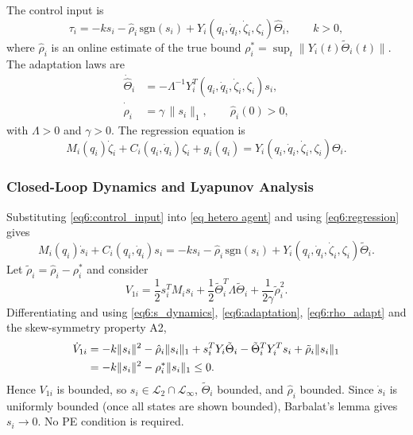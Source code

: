 The control input is
\begin{equation}\label{eq6:control_input}
	\tau_i = -k s_i - \hat{\rho}_i\,\mathrm{sgn}(s_i)
	+ Y_i(q_i,\dot{q}_i,\dot{\zeta}_i,\zeta_i) \hat{\Theta}_i,\qquad k>0,
\end{equation}
where $\hat{\rho}_i$ is an online estimate of the true bound
$\rho_i^* = \sup_t\|Y_i(t)\tilde{\Theta}_i(t)\|$. The adaptation laws are
\begin{align}
	\dot{\hat{\Theta}}_i &= -\Lambda^{-1} Y_i^T(q_i,\dot{q}_i,\dot{\zeta}_i,\zeta_i) s_i,
	\label{eq6:adaptation}\\
	\dot{\hat{\rho}}_i &= \gamma\,\|s_i\|_1,\qquad \hat{\rho}_i(0) > 0,
	\label{eq6:rho_adapt}
\end{align}
with $\Lambda > 0$ and $\gamma > 0$. The regression equation is
\begin{equation}\label{eq6:regression}
	M_i(q_i)\dot{\zeta}_i + C_i(q_i,\dot{q}_i)\zeta_i + g_i(q_i)
	= Y_i(q_i,\dot{q}_i,\dot{\zeta}_i,\zeta_i)\Theta_i.
\end{equation}

\subsubsection{Closed-Loop Dynamics and Lyapunov Analysis}

Substituting \eqref{eq6:control_input} into \eqref{eq hetero agent} and using
\eqref{eq6:regression} gives
\begin{equation}\label{eq6:s_dynamics}
	M_i(q_i)\dot{s}_i + C_i(q_i,\dot{q}_i)s_i
	= -k s_i - \hat{\rho}_i\,\mathrm{sgn}(s_i)
	+ Y_i(q_i,\dot{q}_i,\dot{\zeta}_i,\zeta_i)\tilde{\Theta}_i.
\end{equation}
Let $\tilde{\rho}_i = \hat{\rho}_i - \rho_i^*$ and consider
\begin{equation}\label{eq6:V}
	V_{1i} = \frac12 s_i^T M_i s_i
	+ \frac12 \tilde{\Theta}_i^T \Lambda \tilde{\Theta}_i
	+ \frac{1}{2\gamma}\tilde{\rho}_i^2.
\end{equation}
Differentiating and using \eqref{eq6:s_dynamics}, \eqref{eq6:adaptation},
\eqref{eq6:rho_adapt} and the skew-symmetry property A2,
\begin{align}
	\dot{V}_{1i}
	&= -k\|s_i\|^2 - \hat{\rho}_i\|s_i\|_1
		+ s_i^T Y_i\tilde{\Theta}_i
		- \tilde{\Theta}_i^T Y_i^T s_i
		+ \tilde{\rho}_i\|s_i\|_1 \notag\\
	&= -k\|s_i\|^2 - \rho_i^*\|s_i\|_1 \le 0. \label{eq6:V_dot}
\end{align}
Hence $V_{1i}$ is bounded, so $s_i \in \mathcal{L}_2 \cap \mathcal{L}_\infty$,
$\tilde{\Theta}_i$ bounded, and $\hat{\rho}_i$ bounded. Since $\dot{s}_i$ is uniformly
bounded (once all states are shown bounded), Barbalat's lemma gives $s_i \to 0$. No PE
condition is required.

